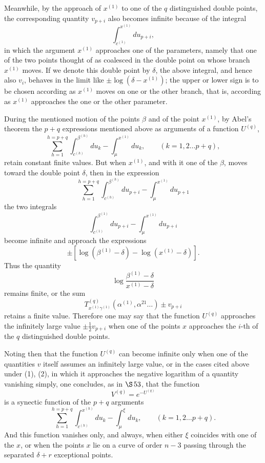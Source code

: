 \documentclass[10pt]{article}
\begin{document}
Meanwhile, by the approach of \(x^{(1)}\) to one of the \(q\) distinguished double points, the corresponding quantity \(v_{p+i}\) also becomes infinite because of the integral
\[
\int_{c^{(1)}}^{x^{(1)}}du_{p+i},
\]
in which the argument \(x^{(1)}\) approaches one of the parameters, namely that one of the two points thought of as coalesced in the double point on whose branch \(x^{(1)}\) moves. If we denote this double point by \(\delta\), the above integral, and hence also \(v_i\), behaves in the limit like \(\pm\log(\delta-x^{(1)})\); the upper or lower sign is to be chosen according as \(x^{(1)}\) moves on one or the other branch, that is, according as \(x^{(1)}\) approaches the one or the other parameter.

During the mentioned motion of the points \(\beta\) and of the point \(x^{(1)}\), by Abel's theorem the \(p+q\) expressions mentioned above as arguments of a function \(U^{(q)}\),
\[
\sum_{h=1}^{h=p+q}\int_{c^{(h)}}^{\beta^{(h)}}du_k-\int_{\mu}^{x^{(1)}}du_k,
\qquad (k=1,2\ldots p+q),
\]
retain constant finite values. But when \(x^{(1)}\), and with it one of the \(\beta\), moves toward the double point \(\delta\), then in the expression
\[
\sum_{h=1}^{h=p+q}\int_{c^{(h)}}^{\beta^{(h)}}du_{p+i}-\int_{\mu}^{x^{(1)}}du_{p+1}
\]
the two integrals
\[
\int_{c^{(1)}}^{\beta^{(1)}}du_{p+i}-\int_{\mu}^{x^{(1)}}du_{p+i}
\]
become infinite and approach the expressions
\[
\pm\left[\log(\beta^{(1)}-\delta)-\log(x^{(1)}-\delta)\right].
\]
Thus the quantity
\[
\log\frac{\beta^{(1)}-\delta}{x^{(1)}-\delta}
\]
remains finite, or the sum
\[
T_{x^{(1)}\gamma^{(1)}}^{(q)}(\alpha^{(1)},\alpha^{21}\ldots)\pm v_{p+i}
\]
retains a finite value. Therefore one may say that the function \(U^{(q)}\) approaches the infinitely large value \(\pm\frac12v_{p+i}\) when one of the points \(x\) approaches the \(i\)-th of the \(q\) distinguished double points.

Noting then that the function \(U^{(q)}\) can become infinite only when one of the quantities \(v\) itself assumes an infinitely large value, or in the cases cited above under (1), (2), in which it approaches the negative logarithm of a quantity vanishing simply, one concludes, as in \(\S\,53\), that the function
\[
V^{(q)}=e^{-U^{(q)}}
\]
is a synectic function of the \(p+q\) arguments
\[
\sum_{h=1}^{h=p+q}\int_{c^{(h)}}^{x^{(h)}}du_k-\int_{\mu}^{\xi}du_k,
\qquad (k=1,2\ldots p+q).
\]
And this function vanishes only, and always, when either \(\xi\) coincides with one of the \(x\), or when the points \(x\) lie on a curve of order \(n-3\) passing through the separated \(\delta+r\) exceptional points.
\end{document}
